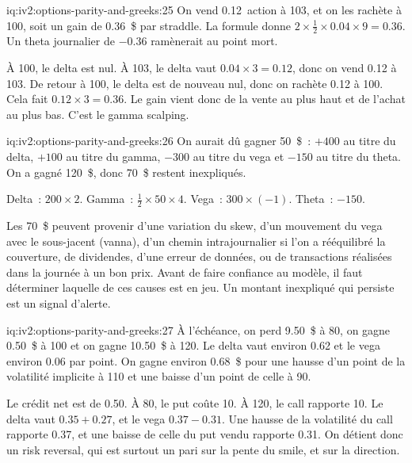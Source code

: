 \begin{solution}{iq:iv2:options-parity-and-greeks:25}
On vend 0.12~action à 103, et on les rachète à 100, soit un gain de 0.36~\$ par straddle. La formule donne $2 \times \tfrac12 \times 0.04 \times 9 = 0.36$. Un theta journalier de $-0.36$ ramènerait au point mort.

À 100, le delta est nul. À 103, le delta vaut $0.04 \times 3 = 0.12$, donc on vend 0.12 à 103. De retour à 100, le delta est de nouveau nul, donc on rachète 0.12 à 100. Cela fait $0.12 \times 3 = 0.36$. Le gain vient donc de la vente au plus haut et de l'achat au plus bas. C'est le gamma scalping.

\end{solution}

\begin{solution}{iq:iv2:options-parity-and-greeks:26}
On aurait dû gagner 50~\$~: $+400$ au titre du delta, $+100$ au titre du gamma, $-300$ au titre du vega et $-150$ au titre du theta. On a gagné 120~\$, donc 70~\$ restent inexpliqués.

Delta~: $200 \times 2$. Gamma~: $\tfrac12 \times 50 \times 4$. Vega~: $300 \times (-1)$. Theta~: $-150$.

Les 70~\$ peuvent provenir d'une variation du skew, d'un mouvement du vega avec le sous-jacent (vanna), d'un chemin intrajournalier si l'on a rééquilibré la couverture, de dividendes, d'une erreur de données, ou de transactions réalisées dans la journée à un bon prix. Avant de faire confiance au modèle, il faut déterminer laquelle de ces causes est en jeu. Un montant inexpliqué qui persiste est un signal d'alerte.

\end{solution}

\begin{solution}{iq:iv2:options-parity-and-greeks:27}
À l'échéance, on perd 9.50~\$ à 80, on gagne 0.50~\$ à 100 et on gagne 10.50~\$ à 120. Le delta vaut environ 0.62 et le vega environ 0.06 par point. On gagne environ 0.68~\$ pour une hausse d'un point de la volatilité implicite à 110 et une baisse d'un point de celle à 90.

Le crédit net est de 0.50. À 80, le put coûte 10. À 120, le call rapporte 10. Le delta vaut $0.35 + 0.27$, et le vega $0.37 - 0.31$. Une hausse de la volatilité du call rapporte 0.37, et une baisse de celle du put vendu rapporte 0.31. On détient donc un risk reversal, qui est surtout un pari sur la pente du smile, et sur la direction.

\end{solution}

